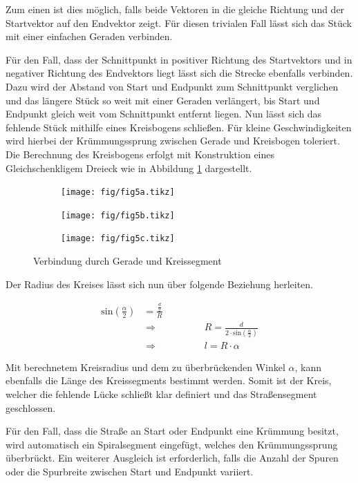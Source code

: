 Zum einen ist dies möglich, falls beide Vektoren in die gleiche Richtung und der Startvektor auf den Endvektor zeigt. Für diesen trivialen Fall lässt sich das Stück mit einer einfachen Geraden verbinden.

Für den Fall, dass der Schnittpunkt in positiver Richtung des Startvektors und in negativer Richtung des Endvektors liegt lässt sich die Strecke ebenfalls verbinden. Dazu wird der Abstand von Start und Endpunkt zum Schnittpunkt verglichen und das längere Stück so weit mit einer Geraden verlängert, bis Start und Endpunkt gleich weit vom Schnittpunkt entfernt liegen. Nun lässt sich das fehlende Stück mithilfe eines Kreisbogens schließen. Für kleine Geschwindigkeiten wird hierbei der Krümmungssprung zwischen Gerade und Kreisbogen toleriert. Die Berechnung des Kreisbogens erfolgt mit Konstruktion eines Gleichschenkligem Dreieck wie in Abbildung \ref{abb5} dargestellt.

\begin{figure}[H]
\flushleft
\begin{subfigure}{0.32\textwidth}
\texttt{[image: fig/fig5a.tikz]}
\end{subfigure}
\begin{subfigure}{0.32\textwidth}
    \texttt{[image: fig/fig5b.tikz]}
\end{subfigure}
\begin{subfigure}{0.32\textwidth}
    \texttt{[image: fig/fig5c.tikz]}
\end{subfigure}
\caption{Verbindung durch Gerade und Kreissegment}
\label{abb5}
\end{figure}

Der Radius des Kreises lässt sich nun über folgende Beziehung herleiten.

\begin{align}
\text{sin}(\frac{\alpha}{2}) &= \frac{\frac{d}{2}}{R} \\
&\Rightarrow \hspace{2cm} R = \frac{d}{2 \cdot \text{sin}(\frac{\alpha}{2})} \\
&\Rightarrow \hspace{2cm} l = R \cdot \alpha
\end{align}

Mit berechnetem Kreisradius und dem zu überbrückenden Winkel \(\alpha\), kann  ebenfalls die Länge des Kreissegments bestimmt werden. Somit ist der Kreis, welcher die fehlende Lücke schließt klar definiert und das Straßensegment geschlossen.

Für den Fall, dass die Straße an Start oder Endpunkt eine Krümmung besitzt, wird automatisch ein Spiralsegment eingefügt, welches den Krümmungssprung überbrückt. Ein weiterer Ausgleich ist erforderlich, falls die Anzahl der Spuren oder die Spurbreite zwischen Start und Endpunkt variiert.

